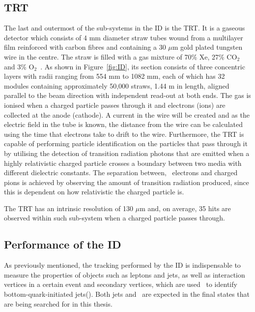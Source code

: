 			\subsection*{TRT}
			 
				The last and outermost of the sub-systems in the \ac{ID} is the \ac{TRT}. It is a gaseous detector which consists of 4 mm diameter straw tubes wound from a multilayer film reinforced with carbon fibres and containing a 30 $\mu$m gold plated tungsten wire in the centre. The straw is filled with a gas mixture of 70\% Xe, 27\% CO$_2$ and 3\% O$_2$~\cite{TRT2012}. As shown in Figure~\ref{fig:ID}, its section consists of three concentric layers with radii ranging from 554 mm to 1082 mm, each of which has 32 modules containing approximately 50,000 straws, 1.44 m in length, aligned parallel to the beam direction with independent read-out at both ends. The gas is ionised when a charged particle passes through it and electrons (ions) are collected at the anode (cathode). A current in the wire will be created and as the electric field in the tube is known, the distance from the wire can be calculated using the time that electrons take to drift to the wire. 
				Furthermore, the \ac{TRT} is capable of performing particle identification on the particles that pass through it by utilising the detection of transition radiation photons that are emitted when a highly relativistic charged particle crosses a boundary between two media with different dielectric constants. The separation between, \eg\ electrons and charged pions is achieved by observing the amount of transition radiation produced, since this is dependent on how relativistic the charged particle is.

				The \ac{TRT} has an intrinsic resolution of 130 $\mu$m and, on average, 35 hits are observed within such sub-system when a charged particle passes through.


			\subsection*{Performance of the ID}

				As previously mentioned, the tracking performed by the \ac{ID} is indispensable to measure the properties of objects such as leptons and jets, as well as interaction vertices in a certain event and secondary vertices, which are used \eg\ to identify bottom-quark-initiated jets(\bjs). Both jets and \bjs\ are expected in the final states that are being searched for in this thesis. 


